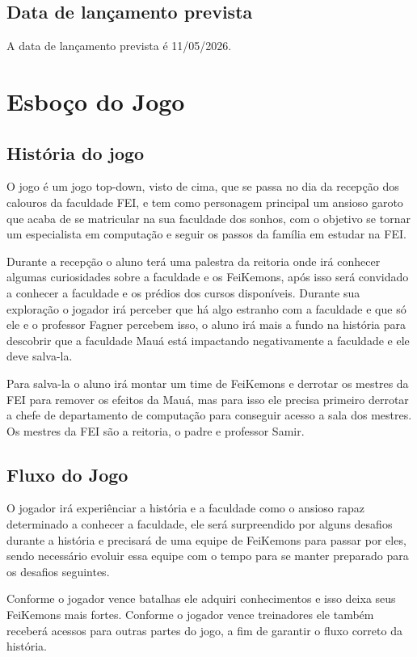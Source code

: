 \documentclass[a4paper,12pt]{article}
\begin{document}
\subsection{Data de lançamento prevista}
A data de lançamento prevista é 11/05/2026.

\newpage
\section{Esboço do Jogo}
\subsection{História do jogo}
O jogo é um jogo top-down, visto de cima, que se passa no dia da recepção dos calouros da faculdade FEI, e tem como personagem principal
um ansioso garoto que acaba de se matricular na sua faculdade dos sonhos, com o objetivo se tornar um especialista em computação e seguir os passos da família
em estudar na FEI.

Durante a recepção o aluno terá uma palestra da reitoria onde irá conhecer algumas curiosidades sobre a faculdade e os FeiKemons,
após isso será convidado a conhecer a faculdade e os prédios dos cursos disponíveis. Durante sua exploração o jogador irá perceber que
há algo estranho com a faculdade e que só ele e o professor Fagner percebem isso, o aluno irá mais a fundo na história para descobrir que a faculdade
Mauá está impactando negativamente a faculdade e ele deve salva-la.

Para salva-la o aluno irá montar um time de FeiKemons e derrotar os mestres da FEI para remover os efeitos da Mauá, mas para isso ele precisa primeiro derrotar
a chefe de departamento de computação para conseguir acesso a sala dos mestres.
Os mestres da FEI são a reitoria, o padre e professor Samir.

\subsection{Fluxo do Jogo}
O jogador irá experiênciar a história e a faculdade como o ansioso rapaz determinado a conhecer a faculdade, ele será surpreendido por
alguns desafios durante a história e precisará de uma equipe de FeiKemons para passar por eles, sendo necessário evoluir essa equipe com o tempo
para se manter preparado para os desafios seguintes.

Conforme o jogador vence batalhas ele adquiri conhecimentos e isso deixa seus FeiKemons mais fortes. Conforme o jogador vence treinadores
ele também receberá acessos para outras partes do jogo, a fim de garantir o fluxo correto da história.
\end{document}
